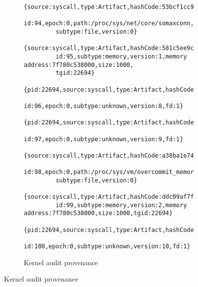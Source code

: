 \begin{figure}[t]

  \begin{subfigure}[b]{\columnwidth}
    {
      \scriptsize
      \begin{Verbatim}[gobble=8]
        {source:syscall,type:Artifact,hashCode:53bcf1cc966af740e6947b0e9c2a339b,
         id:94,epoch:0,path:/proc/sys/net/core/somaxconn,permissions:0644,
         subtype:file,version:0}
        {source:syscall,type:Artifact,hashCode:581c5ee9cdcf7389575329bf82952436,
         id:95,subtype:memory,version:1,memory address:7f780c538000,size:1000,
         tgid:22694}
        {pid:22694,source:syscall,type:Artifact,hashCode:aacd358e7170deccc70c2f88b52d4cef,
         id:96,epoch:0,subtype:unknown,version:8,fd:1}
        {pid:22694,source:syscall,type:Artifact,hashCode:c86147ac594fd4f80b476a6a928aaf56,
         id:97,epoch:0,subtype:unknown,version:9,fd:1}
        {source:syscall,type:Artifact,hashCode:a38ba1e7456b3e55852c279196a27603,
         id:98,epoch:0,path:/proc/sys/vm/overcommit_memory,permissions:0644,
         subtype:file,version:0}
        {source:syscall,type:Artifact,hashCode:ddc09af7f5ee63ea5d27b62bce4f92e7,
         id:99,subtype:memory,version:2,memory address:7f780c538000,size:1000,tgid:22694}
        {pid:22694,source:syscall,type:Artifact,hashCode:55e22f988b6b65f2114cdaa4e944480d,
         id:100,epoch:0,subtype:unknown,version:10,fd:1}
      \end{Verbatim}
    }
    \caption{Kernel audit provenance}
  \end{subfigure}

  \vspace{0.5cm}


\end{figure}
